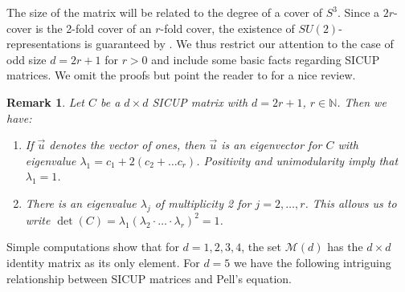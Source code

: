 \documentclass[11pt]{amsart}
\newtheorem{remark}[theorem]{Remark}
\newcommand{\N}{\mathbb{N}}
\begin{document}
The size of the matrix will be related to the degree of a cover of $S^3$. Since a $2r$-cover is the 2-fold cover of an $r$-fold cover, the existence of $SU(2)$-representations is guaranteed by . We thus restrict our attention to the case of odd size $d=2r+1$ for $r>0$ and include some basic facts regarding SICUP matrices. We omit the proofs but point the reader to \cite[Chapter 3]{gray} for a nice review.


\begin{remark}\label{prop:circulant} Let $C$ be a $d\times d$ SICUP matrix with $d=2r+1$, $r\in\N$. Then we have:
\begin{enumerate}
\item If $\vec{u}$ denotes the vector of ones, then $\vec{u}$ is an eigenvector for $C$ with eigenvalue $\lambda_1=c_1+2(c_2+\ldots c_r)$. Positivity and unimodularity imply that $\lambda_1=1$.
\item There is an eigenvalue $\lambda_j$ of multiplicity 2 for $j=2,\ldots,r$. This allows us to write $\det(C)=\lambda_1(\lambda_2\cdot\ldots\cdot\lambda_r)^2=1$.
\end{enumerate}
\end{remark}

Simple computations show that for $d=1,2,3,4$, the set $\mathcal{M}(d)$ has the $d\times d$ identity matrix as its only element. For $d=5$ we have the following intriguing relationship between SICUP matrices and Pell's equation.  
\end{document}
